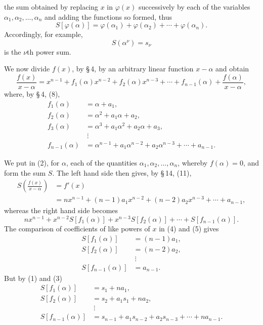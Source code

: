 
the sum obtained by replacing $x$ in $\varphi(x)$ successively by each of the variables $\alpha_1,\alpha_2,\ldots,\alpha_n$ and adding the functions so formed, thus
\[
 S[\varphi(\alpha)]=\varphi(\alpha_1)+\varphi(\alpha_2)+\cdots+\varphi(\alpha_n).
\]
Accordingly, for example,
\[
 S(\alpha^\nu)=s_\nu
\]
is the $\nu$th power sum.

We now divide $f(x)$, by \S\,4, by an arbitrary linear function $x-\alpha$ and obtain
\begin{equation}
 \frac{f(x)}{x-\alpha}
   =x^{n-1}+f_1(\alpha)x^{n-2}+f_2(\alpha)x^{n-3}+\cdots+f_{n-1}(\alpha)+\frac{f(\alpha)}{x-\alpha},
\tag{2}
\end{equation}
where, by \S\,4, (8),
\begin{equation}
\begin{aligned}
 f_1(\alpha)&=\alpha+a_1,\\
 f_2(\alpha)&=\alpha^2+a_1\alpha+a_2,\\
 f_3(\alpha)&=\alpha^3+a_1\alpha^2+a_2\alpha+a_3,\\
 &\ \vdots\\
 f_{n-1}(\alpha)&=\alpha^{n-1}+a_1\alpha^{n-2}+a_2\alpha^{n-3}+\cdots+a_{n-1}.
\end{aligned}
\tag{3}
\end{equation}

We put in (2), for $\alpha$, each of the quantities $\alpha_1,\alpha_2,\ldots,\alpha_n$, whereby $f(\alpha)=0$, and form the sum $S$. The left hand side then gives, by \S\,14, (11),
\begin{equation}
\begin{aligned}
 S\left(\frac{f(x)}{x-\alpha}\right)&=f'(x)\\
 &=n x^{n-1}+(n-1)a_1x^{n-2}+(n-2)a_2x^{n-3}+\cdots+a_{n-1},
\end{aligned}
\tag{4}
\end{equation}
whereas the right hand side becomes
\begin{equation}
 n x^{n-1}+x^{n-2}S[f_1(\alpha)]+x^{n-3}S[f_2(\alpha)]+\cdots+S[f_{n-1}(\alpha)].
\tag{5}
\end{equation}
The comparison of coefficients of like powers of $x$ in (4) and (5) gives
\begin{equation}
\begin{aligned}
 S[f_1(\alpha)]&=(n-1)a_1,\\
 S[f_2(\alpha)]&=(n-2)a_2,\\
 &\ \vdots\\
 S[f_{n-1}(\alpha)]&=a_{n-1}.
\end{aligned}
\tag{6}
\end{equation}
But by (1) and (3)
\[
\begin{aligned}
 S[f_1(\alpha)]&=s_1+na_1,\\
 S[f_2(\alpha)]&=s_2+a_1s_1+na_2,\\
 &\ \vdots\\
 S[f_{n-1}(\alpha)]&=s_{n-1}+a_1s_{n-2}+a_2s_{n-3}+\cdots+na_{n-1}.
\end{aligned}
\]
